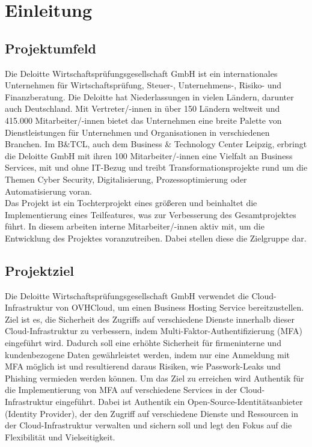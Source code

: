 
\section{Einleitung}
\label{sec:Einleitung}


\subsection{Projektumfeld} 
\label{sec:Projektumfeld}
Die Deloitte Wirtschaftsprüfungsgesellschaft GmbH ist ein internationales 
Unternehmen für Wirtschaftsprüfung, Steuer-, Unternehmens-, Risiko- und Finanzberatung.
Die Deloitte hat Niederlassungen in vielen Ländern, darunter auch Deutschland. 
Mit Vertreter/-innen in über 150 Ländern weltweit und 415.000 Mitarbeiter/-innen bietet das Unternehmen eine breite Palette 
von Dienstleistungen für Unternehmen und Organisationen in verschiedenen Branchen.
Im B\&TCL, auch dem Business \& Technology Center Leipzig, erbringt die Deloitte
GmbH mit ihren 100 Mitarbeiter/-innen eine Vielfalt an Business Services, mit und ohne IT-Bezug und treibt
Transformationsprojekte rund um die Themen Cyber Security, Digitalisierung,
Prozessoptimierung oder Automatisierung voran.
\\Das Projekt ist ein Tochterprojekt eines größeren und beinhaltet die Implementierung eines Teilfeatures, was zur 
Verbesserung des Gesamtprojektes führt. In diesem arbeiten interne Mitarbeiter/-innen aktiv mit, um die Entwicklung des
Projektes voranzutreiben. Dabei stellen diese die Zielgruppe dar.


\subsection{Projektziel} 
\label{sec:Projektziel}
Die Deloitte Wirtschaftsprüfungsgesellschaft GmbH verwendet die Cloud-Infrastruktur von OVHCloud, um einen Business 
Hosting Service bereitzustellen. 
\\Ziel ist es, die Sicherheit des Zugriffs auf verschiedene Dienste innerhalb dieser Cloud-Infrastruktur zu verbessern, indem 
Multi-Faktor-Authentifizierung (\acs*{MFA}) eingeführt wird. Dadurch soll eine erhöhte Sicherheit für firmeninterne und kundenbezogene 
Daten gewährleistet werden, indem nur eine Anmeldung mit \acs*{MFA} möglich ist und resultierend daraus Risiken, wie Passwork-Leaks 
und Phishing vermieden werden können.
Um das Ziel zu erreichen wird Authentik für die Implementierung von \acs*{MFA} auf verschiedene Services in der 
Cloud-Infrastruktur eingeführt. 
Dabei ist Authentik ein Open-Source-Identitätsanbieter (Identity Provider), der den Zugriff auf verschiedene Dienste und 
Ressourcen in der Cloud-Infrastruktur verwalten und sichern soll und legt den Fokus auf die Flexibilität und Vielseitigkeit. 


